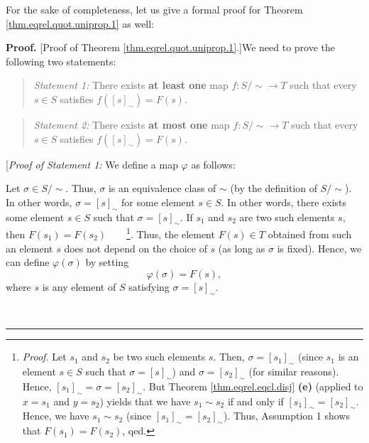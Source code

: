 \documentclass[numbers=enddot,12pt,final,onecolumn,notitlepage]{scrartcl}%
\numberwithin{exer}{subsection}
\theoremstyle{definition}
\newenvironment{statement}{\begin{quote}}{\end{quote}}
\newenvironment{fineprint}{\begin{small}}{\end{small}}
\newenvironment{proof}[1][Proof]{\noindent\textbf{#1.} }{\ \rule{0.5em}{0.5em}}
\begin{document}
\begin{fineprint}
For the sake of completeness, let us give a formal proof for Theorem
\ref{thm.eqrel.quot.uniprop.1} as well:

\begin{proof}
[Proof of Theorem \ref{thm.eqrel.quot.uniprop.1}.]We need to prove the
following two statements:

\begin{statement}
\textit{Statement 1:} There exists \textbf{at least one} map $f:\left.
S/\sim\right.  \rightarrow T$ such that every $s\in S$ satisfies $f\left(
\left[  s\right]  _{\sim}\right)  =F\left(  s\right)  $.
\end{statement}

\begin{statement}
\textit{Statement 2:} There exists \textbf{at most one} map $f:\left.
S/\sim\right.  \rightarrow T$ such that every $s\in S$ satisfies $f\left(
\left[  s\right]  _{\sim}\right)  =F\left(  s\right)  $.
\end{statement}

[\textit{Proof of Statement 1:} We define a map $\varphi$ as follows:

Let $\sigma\in\left.  S/\sim\right.  $. Thus, $\sigma$ is an equivalence class
of $\sim$ (by the definition of $S/\sim$). In other words, $\sigma=\left[
s\right]  _{\sim}$ for some element $s\in S$. In other words, there exists
some element $s\in S$ such that $\sigma=\left[  s\right]  _{\sim}$. If $s_{1}$
and $s_{2}$ are two such elements $s$, then $F\left(  s_{1}\right)  =F\left(
s_{2}\right)  $\ \ \ \ \footnote{\textit{Proof.} Let $s_{1}$ and $s_{2}$ be
two such elements $s$. Then, $\sigma=\left[  s_{1}\right]  _{\sim}$ (since
$s_{1}$ is an element $s\in S$ such that $\sigma=\left[  s\right]  _{\sim}$)
and $\sigma=\left[  s_{2}\right]  _{\sim}$ (for similar reasons). Hence,
$\left[  s_{1}\right]  _{\sim}=\sigma=\left[  s_{2}\right]  _{\sim}$. But
Theorem \ref{thm.eqrel.eqcl.disj} \textbf{(e)} (applied to $x=s_{1}$ and
$y=s_{2}$) yields that we have $s_{1}\sim s_{2}$ if and only if $\left[
s_{1}\right]  _{\sim}=\left[  s_{2}\right]  _{\sim}$. Hence, we have
$s_{1}\sim s_{2}$ (since $\left[  s_{1}\right]  _{\sim}=\left[  s_{2}\right]
_{\sim}$). Thus, Assumption 1 shows that $F\left(  s_{1}\right)  =F\left(
s_{2}\right)  $, qed.}. Thus, the element $F\left(  s\right)  \in T$ obtained
from such an element $s$ does not depend on the choice of $s$ (as long as
$\sigma$ is fixed). Hence, we can define $\varphi\left(  \sigma\right)  $ by
setting
\begin{equation}
\varphi\left(  \sigma\right)  =F\left(  s\right)  ,
\label{pf.thm.eqrel.quot.uniprop.1.s1.pf.3}%
\end{equation}
where $s$ is any element of $S$ satisfying $\sigma=\left[  s\right]  _{\sim}$.


\end{proof}
\end{fineprint}
\end{document}
